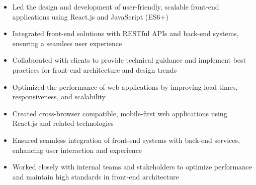 \par\smallskip
\begin{minipage}{13.75cm}
  \begin{minipage}{6.5cm}
    \begin{itemize}
      \item Led the design and development of user-friendly, scalable front-end applications using React.js and JavaScript (ES6+)
      \item Integrated front-end solutions with RESTful APIs and back-end systems, ensuring a seamless user experience
    \end{itemize}
  \end{minipage}
  \hfill
  \begin{minipage}{6.5cm}
    \begin{itemize}
      \item Collaborated with clients to provide technical guidance and implement best practices for front-end architecture and design trends
      \item Optimized the performance of web applications by improving load times, responsiveness, and scalability
    \end{itemize}
  \end{minipage}
\end{minipage}
\par\smallskip
\divider

\par\smallskip
\begin{minipage}{13.75cm}
  \begin{minipage}{6.5cm}
    \begin{itemize}
      \item Created cross-browser compatible, mobile-first web applications using React.js and related technologies
      \item Ensured seamless integration of front-end systems with back-end services, enhancing user interaction and experience
    \end{itemize}
  \end{minipage}
  \hfill
  \begin{minipage}{6.5cm}
    \begin{itemize}
      \item Worked closely with internal teams and stakeholders to optimize performance and maintain high standards in front-end architecture
    \end{itemize}
  \end{minipage}
\end{minipage}

